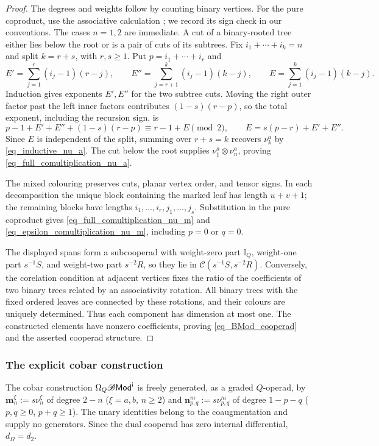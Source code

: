 \documentclass[11pt,letterpaper]{article}
\numberwithin{equation}{section}
\theoremstyle{plain}
\theoremstyle{definition}
\theoremstyle{remark}
\newcommand{\antishriek}{%
	\mathord{\mathchoice
		{\rotatebox[origin=c]{180}{$\displaystyle !$}}
		{\rotatebox[origin=c]{180}{$\textstyle !$}}
		{\rotatebox[origin=c]{180}{$\scriptstyle !$}}
		{\rotatebox[origin=c]{180}{$\scriptscriptstyle !$}}}}
\begin{document}
\begin{proof}
The degrees and weights follow by counting binary vertices.
For the pure coproduct, use the associative calculation
\cite[Lemma 9.1.2]{loday2012algebraic}; we record its sign check in our
conventions. The cases $n=1,2$ are immediate. A cut of a binary-rooted
tree either lies below the root
or is a pair of cuts of its subtrees. Fix $i_1+\cdots+i_k=n$ and split
$k=r+s$, with $r,s\ge1$. Put $p=i_1+\cdots+i_r$ and
\[
E'=\sum_{j=1}^r(i_j-1)(r-j),\qquad
E''=\sum_{j=r+1}^k(i_j-1)(k-j),\qquad
E=\sum_{j=1}^k(i_j-1)(k-j).
\]
Induction gives exponents $E',E''$ for the two subtree cuts. Moving
the right outer factor past the left inner factors contributes
$(1-s)(r-p)$, so the total exponent, including the recursion sign, is
\[
p-1+E'+E''+(1-s)(r-p)\equiv r-1+E\pmod2,
\qquad E=s(p-r)+E'+E''.
\]
Since $E$ is independent of the split, summing over $r+s=k$ recovers
$\nu_k^a$ by \eqref{eq_inductive_nu_a}. The cut below the root supplies
$\nu_1^a\otimes\nu_n^a$, proving \eqref{eq_full_comultiplication_nu_a}.

The mixed colouring preserves cuts, planar vertex order, and tensor
signs. In each decomposition the unique block containing the marked
leaf has length $u+v+1$; the remaining blocks have lengths
$i_1,\ldots,i_r,j_1,\ldots,j_s$. Substitution in the pure coproduct
gives \eqref{eq_full_comultiplication_nu_m} and
\eqref{eq_epsilon_comultiplication_nu_m}, including $p=0$ or $q=0$.

The displayed spans form a subcooperad with weight-zero part
$\mathbb I_Q$, weight-one part $s^{-1}S$, and weight-two part
$s^{-2}R$, so they lie in $\mathscr C(s^{-1}S,s^{-2}R)$.
Conversely, the corelation condition at adjacent vertices fixes the
ratio of the coefficients of two binary trees related by an
associativity rotation. All binary trees with the fixed ordered leaves
are connected by these rotations, and their colours are uniquely
determined. Thus each component has dimension at most one. The
constructed elements have nonzero coefficients, proving
\eqref{eq_BMod_cooperad} and the asserted cooperad structure.
\end{proof}

\subsubsection{The explicit cobar construction}
\label{sss_bimodule_explicit_cobar}
The cobar construction $\Omega_Q\mathscr B\mathsf{Mod}^{\antishriek}$
is freely generated, as a graded $Q$-operad, by
$\mathbf m_n^\xi:=s\nu_n^\xi$ of degree $2-n$
($\xi=a,b$, $n\ge2$) and
$\mathbf n_{p,q}^m:=s\nu_{p,q}^m$ of degree $1-p-q$
($p,q\ge0$, $p+q\ge1$). The unary identities belong to the
coaugmentation and supply no generators. Since the dual cooperad has
zero internal differential, $d_\Omega=d_2$.
\end{document}

